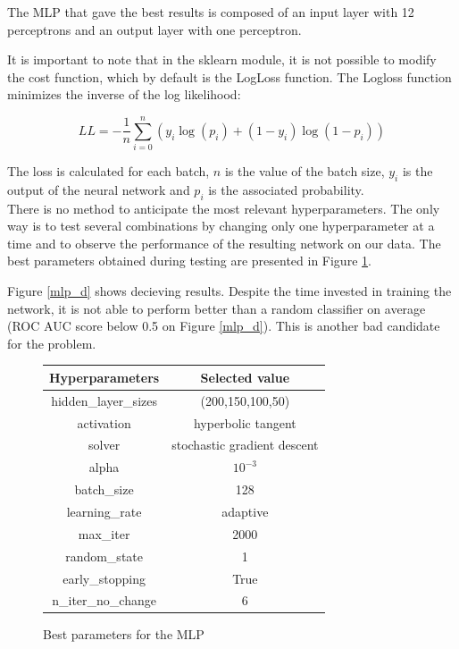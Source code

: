The MLP that gave the best results is composed of an input layer with 12
perceptrons and an output layer with one perceptron.

It is important to note that in the sklearn module, it is not possible to
modify the cost function, which by default is the LogLoss function. The Logloss
function minimizes the inverse of the log likelihood:

\[LL = -\frac{1}{n}\sum_{i=0}^{n} \left( y_{i} \log (p_{i}) + (1-y_{i}) \log
    (1-p_{i}) \right) \]

The loss is calculated for each batch, \(n\) is the value of the batch size,
\(y_i\) is the output of the neural network and \(p_i\) is the associated
probability.\\

There is no method to anticipate the most relevant hyperparameters. The only
way is to test several combinations by changing only one hyperparameter at a
time and to observe the performance of the resulting network on our data. The
best parameters obtained during testing are presented in Figure
\ref{mlp_param}.

Figure \ref{mlp_d} shows decieving results. Despite the time invested in training the network, it is not able to perform better than a random classifier on average (ROC AUC score below 0.5 on Figure \ref{mlp_d}). This is another bad candidate for the problem.\\

\begin{figure}
    \begin{center}
        \begin{tabular}{|c|c|}
            \hline
            \textbf{Hyperparameters} & \textbf{Selected value}     \\ \hline
            hidden\_layer\_sizes     & (200,150,100,50)            \\ \hline
            activation               & hyperbolic tangent          \\ \hline
            solver                   & stochastic gradient descent \\ \hline
            alpha                    & \(10^{-3}\)                 \\ \hline
            batch\_size              & 128                         \\ \hline
            learning\_rate           & adaptive                    \\ \hline
            max\_iter                & 2000                        \\ \hline
            random\_state            & 1                           \\ \hline
            early\_stopping          & True                        \\ \hline
            n\_iter\_no\_change      & 6                           \\ \hline
        \end{tabular}
    \end{center}
    \caption{Best parameters for the MLP}
    \label{mlp_param}
\end{figure}

